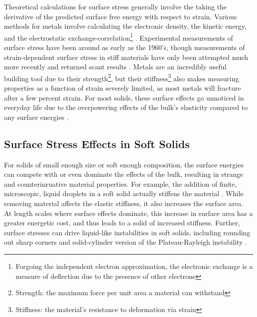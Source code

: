 Theoretical calculations for surface stress generally involve the taking the derivative of the predicted surface free energy with respect to strain. Various methods for metals involve calculating the electronic density, the kinetic energy, and the electrostatic exchange-correlation\footnote{Forgoing the independent electron approximation, the electronic exchange is a measure of deflection due to the presence of other electrons} \cite{GURTIN1978431}. Experimental measurements of surface stress have been around as early as the 1960's, though measurements of strain-dependent surface stress in stiff materials have only been attempted much more recently and returned scant results \cite{mays1968surface,wasserman1970determination,hanneman1962elastic,martinez1990direct,schell1990mechanical}. Metals are an incredibly useful building tool due to their strength\footnote{Strength: the maximum force per unit area a material can withstand}, but their stiffness\footnote{Stiffness: the material's resistance to deformation via strain} also makes measuring properties as a function of strain severely limited, as most metals will fracture after a few percent strain. For most solids, these surface effects go unnoticed in everyday life due to the overpowering effects of the bulk's elasticity compared to any surface energies \cite{miller2000size,dingreville2005surface,duan2005eshelby,sharma2004size,he2008surface,lu2014towards}.



\subsection{Surface Stress Effects in Soft Solids}
For solids of small enough size or soft enough composition, the surface energies can compete with or even dominate the effects of the bulk, resulting in strange and counterinruative material properties. For example, the addition of finite, microscopic, liquid droplets in a soft solid actually stiffens the material \cite{style2015stiffening}. While removing material affects the elastic stiffness, it also increases the surface area. At length scales where surface effects dominate, this increase in surface area has a greater energetic cost, and thus leads to a solid of increased stiffness. Further, surface stresses can drive liquid-like instabilities in soft solids, including rounding out sharp corners \cite{mora2015softening} and solid-cylinder version of the Plateau-Rayleigh instability \cite{mora2010capillarity}.

